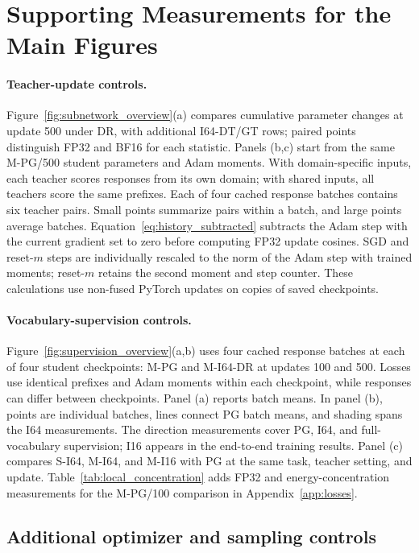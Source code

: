 \section{Supporting Measurements for the Main Figures}
\label{app:nine_panel_support}


\paragraph{Teacher-update controls.}
Figure~\ref{fig:subnetwork_overview}(a) compares cumulative parameter changes at update 500 under DR, with additional I64-DT/GT rows; paired points distinguish FP32 and BF16 for each statistic. Panels (b,c) start from the same M-PG/500 student parameters and Adam moments. With domain-specific inputs, each teacher scores responses from its own domain; with shared inputs, all teachers score the same prefixes. Each of four cached response batches contains six teacher pairs. Small points summarize pairs within a batch, and large points average batches. Equation~\ref{eq:history_subtracted} subtracts the Adam step with the current gradient set to zero before computing FP32 update cosines. SGD and reset-$m$ steps are individually rescaled to the norm of the Adam step with trained moments; reset-$m$ retains the second moment and step counter. These calculations use non-fused PyTorch updates on copies of saved checkpoints.

\paragraph{Vocabulary-supervision controls.}
Figure~\ref{fig:supervision_overview}(a,b) uses four cached response batches at each of four student checkpoints: M-PG and M-I64-DR at updates 100 and 500. Losses use identical prefixes and Adam moments within each checkpoint, while responses can differ between checkpoints. Panel (a) reports batch means. In panel (b), points are individual batches, lines connect PG batch means, and shading spans the I64 measurements. The direction measurements cover PG, I64, and full-vocabulary supervision; I16 appears in the end-to-end training results. Panel (c) compares S-I64, M-I64, and M-I16 with PG at the same task, teacher setting, and update. Table~\ref{tab:local_concentration} adds FP32 and energy-concentration measurements for the M-PG/100 comparison in Appendix~\ref{app:losses}.

\subsection{Additional optimizer and sampling controls}
\label{app:added_controls}

